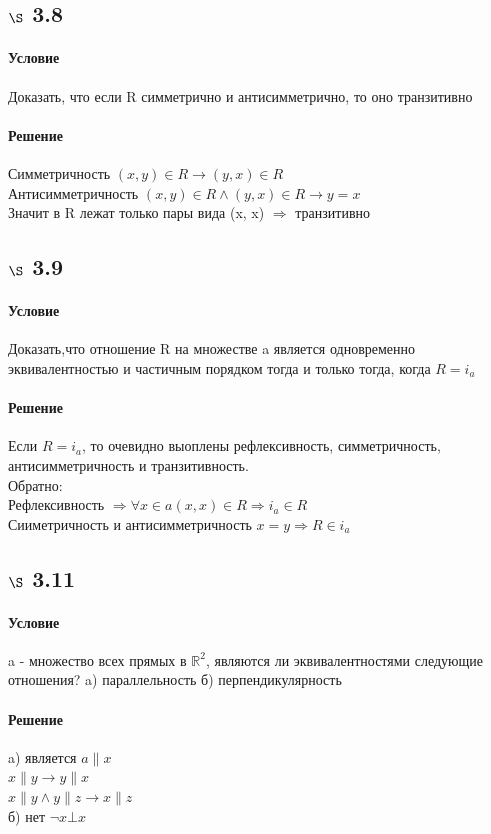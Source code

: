 \documentclass[a4paper,12pt]{article}
\begin{document}
\subsection*{$\S$ 3.8}
\paragraph*{Условие}
Доказать, что если R симметрично и антисимметрично, то оно транзитивно
\paragraph*{Решение}
Симметричность $(x, y) \in R \rightarrow (y, x) \in R$\\
Антисимметричность $(x, y) \in R \wedge (y, x) \in R \rightarrow y = x$\\
Значит в R лежат только пары вида (x, x) $\Rightarrow$ транзитивно

\subsection*{$\S$ 3.9}
\paragraph*{Условие}
Доказать,что отношение R на множестве a является одновременно эквивалентностью и частичным порядком тогда и только тогда, когда $ R = i_a$
\paragraph*{Решение}
Если $ R = i_a$, то очевидно выоплены рефлексивность, симметричность, антисимметричность и транзитивность.\\
Обратно:\\
Рефлексивность $\Rightarrow \forall x \in a (x, x) \in R \Rightarrow i_a \in R$\\
Сииметричность и антисимметричность $ x = y \Rightarrow R \in  i_a $

\subsection*{$\S$ 3.11}
\paragraph*{Условие}
a - множество всех прямых в $\mathbb{R}^2$, являются ли эквивалентностями следующие отношения?
a) параллельность
б) перпендикулярность
\paragraph*{Решение}
a) является $ a \parallel x $\\
$ x \parallel y \rightarrow y \parallel x$\\
$ x \parallel y \wedge  y \parallel z \rightarrow x \parallel z $\\
б) нет $ \neg x \bot x $ 
\end{document}
